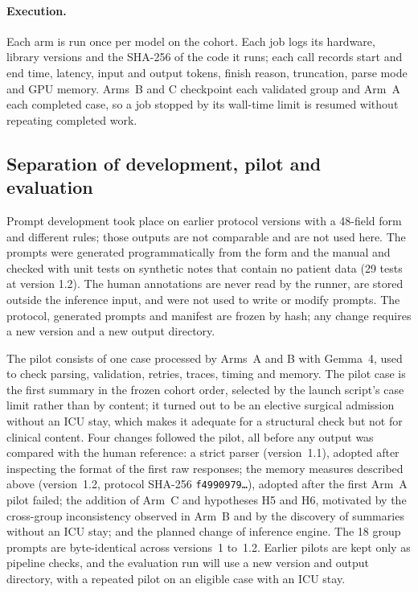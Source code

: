 \paragraph{Execution.} Each arm is run once per model on the cohort. Each job logs its hardware, library
versions and the SHA-256 of the code it runs; each call records start and end time, latency, input and output
tokens, finish reason, truncation, parse mode and GPU memory. Arms~B and C checkpoint each validated group and
Arm~A each completed case, so a job stopped by its wall-time limit is resumed without repeating completed work.

\subsection{Separation of development, pilot and evaluation}\label{sec:separation}

Prompt development took place on earlier protocol versions with a 48-field form and different rules;
those outputs are not comparable and are not used here. The \formv{} prompts were generated
programmatically from the form and the manual and checked with unit tests on synthetic notes that contain
no patient data (29 tests at version 1.2). The human annotations are never read by the runner, are stored
outside the inference input, and were not used to write or modify prompts. The protocol, generated prompts
and manifest are frozen by hash; any change requires a new version and a new output directory.

The pilot consists of one case processed by Arms~A and B with Gemma~4, used to check parsing, validation,
retries, traces, timing and memory. The pilot case is the first summary in the frozen cohort order,
selected by the launch script's case limit rather than by content; it turned out to be an elective surgical
admission without an ICU stay, which makes it adequate for a structural check but not for clinical
content. Four changes followed the pilot, all before any output was compared with the human reference: a
strict parser (version~1.1), adopted after inspecting the format of the first raw responses; the memory
measures described above (version~1.2, protocol SHA-256 \texttt{f4990979\ldots}), adopted after the first
Arm~A pilot failed; the addition of Arm~C and hypotheses H5 and H6, motivated by the cross-group
inconsistency observed in Arm~B and by the discovery of summaries without an ICU stay; and the planned change
of inference engine. The 18 group prompts are byte-identical across versions~1 to~1.2. Earlier pilots are
kept only as pipeline checks, and the evaluation run will use a new version and output directory, with a
repeated pilot on an eligible case with an ICU stay.

